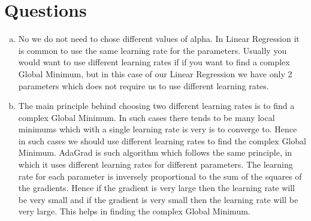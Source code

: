 \documentclass[a4paper]{article}
\begin{document}
\section*{Questions}
\begin{enumerate}[(a)]
	\item No we do not need to chose different values of alpha. In Linear Regression it is common to use the same learning rate for the parameters. Usually you would want to use different learning rates if if you want to find a complex Global Minimum, but in this case of our Linear Regression we have only 2 parameters which does not require us to use different learning rates.
	\item The main principle behind choosing two different learning rates is to find a complex Global Minimum. In such cases there tends to be many local minimums which with a single learning rate is very is to converge to. Hence in such cases we should use different learning rates to find the complex Global Minimum. AdaGrad is such algorithm which follows the same principle, in which it uses different learning rates for different parameters. The learning rate for each parameter is inversely proportional to the sum of the squares of the gradients. Hence if the gradient is very large then the learning rate will be very small and if the gradient is very small then the learning rate will be very large. This helps in finding the complex Global Minimum.
\end{enumerate} 
\end{document}
